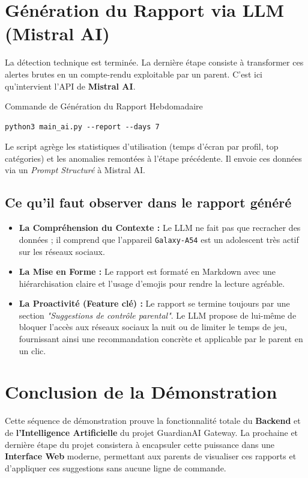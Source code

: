 \documentclass[11pt,a4paper]{article}
\begin{document}
\section{Génération du Rapport via LLM (Mistral AI)}

La détection technique est terminée. La dernière étape consiste à transformer ces alertes brutes en un compte-rendu exploitable par un parent. C'est ici qu'intervient l'API de \textbf{Mistral AI}.

\begin{stepcadre}{Commande de Génération du Rapport Hebdomadaire}
\begin{lstlisting}[language=BashShell]
python3 main_ai.py --report --days 7
\end{lstlisting}
\end{stepcadre}

Le script agrège les statistiques d'utilisation (temps d'écran par profil, top catégories) et les anomalies remontées à l'étape précédente. Il envoie ces données via un \textit{Prompt Structuré} à Mistral AI.

\subsection{Ce qu'il faut observer dans le rapport généré}
\begin{itemize}
    \item \textbf{La Compréhension du Contexte :} Le LLM ne fait pas que recracher des données ; il comprend que l'appareil \texttt{Galaxy-A54} est un adolescent très actif sur les réseaux sociaux.
    \item \textbf{La Mise en Forme :} Le rapport est formaté en Markdown avec une hiérarchisation claire et l'usage d'emojis pour rendre la lecture agréable.
    \item \textbf{La Proactivité (Feature clé) :} Le rapport se termine toujours par une section \textit{"Suggestions de contrôle parental"}. Le LLM propose de lui-même de bloquer l'accès aux réseaux sociaux la nuit ou de limiter le temps de jeu, fournissant ainsi une recommandation concrète et applicable par le parent en un clic.
\end{itemize}

\section*{Conclusion de la Démonstration}

Cette séquence de démonstration prouve la fonctionnalité totale du \textbf{Backend} et de \textbf{l'Intelligence Artificielle} du projet GuardianAI Gateway. La prochaine et dernière étape du projet consistera à encapsuler cette puissance dans une \textbf{Interface Web} moderne, permettant aux parents de visualiser ces rapports et d'appliquer ces suggestions sans aucune ligne de commande.
\end{document}
